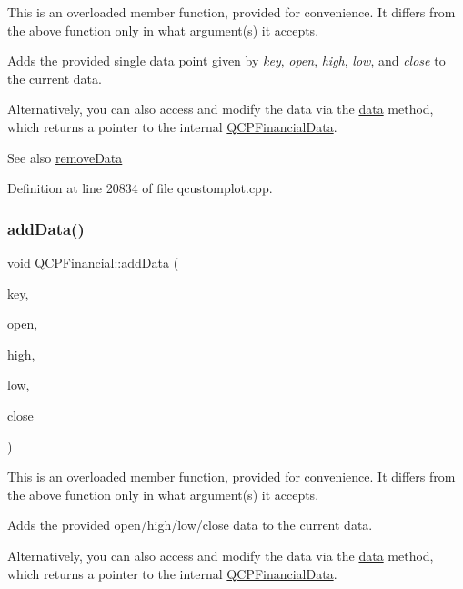 This is an overloaded member function, provided for convenience. It differs from the above function only in what argument(s) it accepts.

Adds the provided single data point given by {\itshape key}, {\itshape open}, {\itshape high}, {\itshape low}, and {\itshape close} to the current data.

Alternatively, you can also access and modify the data via the \hyperlink{class_q_c_p_financial_a528c81578e4f25999a9169127763cfd4}{data} method, which returns a pointer to the internal \hyperlink{class_q_c_p_financial_data}{Q\+C\+P\+Financial\+Data}.

\begin{DoxySeeAlso}{See also}
\hyperlink{class_q_c_p_financial_a048c741d3c8cc5709c2c44b759fdf27c}{remove\+Data} 
\end{DoxySeeAlso}


Definition at line 20834 of file qcustomplot.\+cpp.

\mbox{\label{class_q_c_p_financial_aa1abe3bdafb297497f09cdbdc4db3958}} 
\subsubsection{\texorpdfstring{add\+Data()}{addData()}\hspace{0.1cm}{\footnotesize\ttfamily [4/4]}}
{\footnotesize\ttfamily void Q\+C\+P\+Financial\+::add\+Data (\begin{DoxyParamCaption}\item[{const Q\+Vector$<$ double $>$ \&}]{key,  }\item[{const Q\+Vector$<$ double $>$ \&}]{open,  }\item[{const Q\+Vector$<$ double $>$ \&}]{high,  }\item[{const Q\+Vector$<$ double $>$ \&}]{low,  }\item[{const Q\+Vector$<$ double $>$ \&}]{close }\end{DoxyParamCaption})}

This is an overloaded member function, provided for convenience. It differs from the above function only in what argument(s) it accepts.

Adds the provided open/high/low/close data to the current data.

Alternatively, you can also access and modify the data via the \hyperlink{class_q_c_p_financial_a528c81578e4f25999a9169127763cfd4}{data} method, which returns a pointer to the internal \hyperlink{class_q_c_p_financial_data}{Q\+C\+P\+Financial\+Data}.

